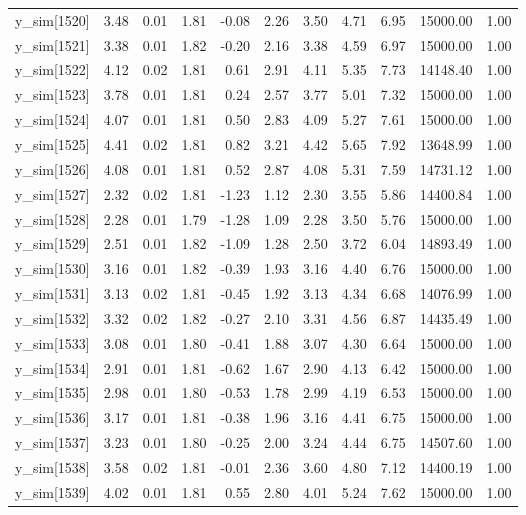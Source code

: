 \begin{table}[ht]
\begin{tabular}{rrrrrrrrrrr}
  y\_sim[1520] & 3.48 & 0.01 & 1.81 & -0.08 & 2.26 & 3.50 & 4.71 & 6.95 & 15000.00 & 1.00 \\ 
  y\_sim[1521] & 3.38 & 0.01 & 1.82 & -0.20 & 2.16 & 3.38 & 4.59 & 6.97 & 15000.00 & 1.00 \\ 
  y\_sim[1522] & 4.12 & 0.02 & 1.81 & 0.61 & 2.91 & 4.11 & 5.35 & 7.73 & 14148.40 & 1.00 \\ 
  y\_sim[1523] & 3.78 & 0.01 & 1.81 & 0.24 & 2.57 & 3.77 & 5.01 & 7.32 & 15000.00 & 1.00 \\ 
  y\_sim[1524] & 4.07 & 0.01 & 1.81 & 0.50 & 2.83 & 4.09 & 5.27 & 7.61 & 15000.00 & 1.00 \\ 
  y\_sim[1525] & 4.41 & 0.02 & 1.81 & 0.82 & 3.21 & 4.42 & 5.65 & 7.92 & 13648.99 & 1.00 \\ 
  y\_sim[1526] & 4.08 & 0.01 & 1.81 & 0.52 & 2.87 & 4.08 & 5.31 & 7.59 & 14731.12 & 1.00 \\ 
  y\_sim[1527] & 2.32 & 0.02 & 1.81 & -1.23 & 1.12 & 2.30 & 3.55 & 5.86 & 14400.84 & 1.00 \\ 
  y\_sim[1528] & 2.28 & 0.01 & 1.79 & -1.28 & 1.09 & 2.28 & 3.50 & 5.76 & 15000.00 & 1.00 \\ 
  y\_sim[1529] & 2.51 & 0.01 & 1.82 & -1.09 & 1.28 & 2.50 & 3.72 & 6.04 & 14893.49 & 1.00 \\ 
  y\_sim[1530] & 3.16 & 0.01 & 1.82 & -0.39 & 1.93 & 3.16 & 4.40 & 6.76 & 15000.00 & 1.00 \\ 
  y\_sim[1531] & 3.13 & 0.02 & 1.81 & -0.45 & 1.92 & 3.13 & 4.34 & 6.68 & 14076.99 & 1.00 \\ 
  y\_sim[1532] & 3.32 & 0.02 & 1.82 & -0.27 & 2.10 & 3.31 & 4.56 & 6.87 & 14435.49 & 1.00 \\ 
  y\_sim[1533] & 3.08 & 0.01 & 1.80 & -0.41 & 1.88 & 3.07 & 4.30 & 6.64 & 15000.00 & 1.00 \\ 
  y\_sim[1534] & 2.91 & 0.01 & 1.81 & -0.62 & 1.67 & 2.90 & 4.13 & 6.42 & 15000.00 & 1.00 \\ 
  y\_sim[1535] & 2.98 & 0.01 & 1.80 & -0.53 & 1.78 & 2.99 & 4.19 & 6.53 & 15000.00 & 1.00 \\ 
  y\_sim[1536] & 3.17 & 0.01 & 1.81 & -0.38 & 1.96 & 3.16 & 4.41 & 6.75 & 15000.00 & 1.00 \\ 
  y\_sim[1537] & 3.23 & 0.01 & 1.80 & -0.25 & 2.00 & 3.24 & 4.44 & 6.75 & 14507.60 & 1.00 \\ 
  y\_sim[1538] & 3.58 & 0.02 & 1.81 & -0.01 & 2.36 & 3.60 & 4.80 & 7.12 & 14400.19 & 1.00 \\ 
  y\_sim[1539] & 4.02 & 0.01 & 1.81 & 0.55 & 2.80 & 4.01 & 5.24 & 7.62 & 15000.00 & 1.00 \\ 

\end{tabular}
\end{table}
